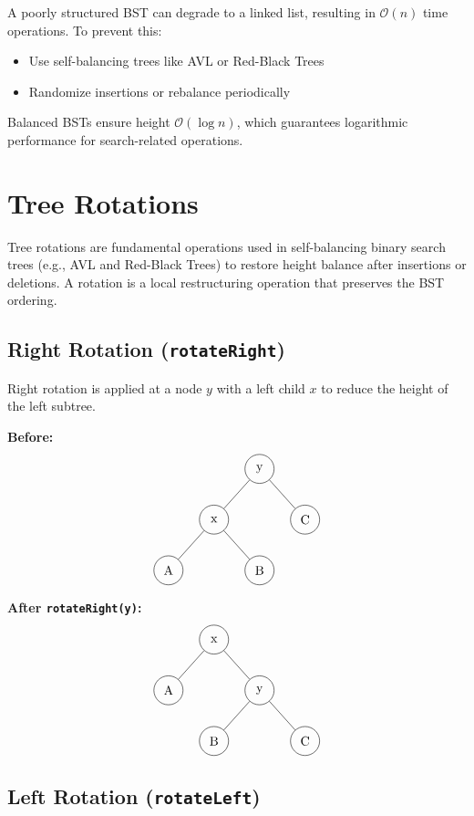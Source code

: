\documentclass{article}
\begin{document}
A poorly structured BST can degrade to a linked list, resulting in $\mathcal{O}(n)$ time operations. To prevent this:

\begin{itemize}
  \item Use self-balancing trees like AVL or Red-Black Trees
  \item Randomize insertions or rebalance periodically
\end{itemize}

Balanced BSTs ensure height $\mathcal{O}(\log n)$, which guarantees logarithmic performance for search-related operations.

\section{Tree Rotations}

Tree rotations are fundamental operations used in self-balancing binary search trees (e.g., AVL and Red-Black Trees) to restore height balance after insertions or deletions. A rotation is a local restructuring operation that preserves the BST ordering.

\subsection{Right Rotation (\texttt{rotateRight})}

Right rotation is applied at a node $y$ with a left child $x$ to reduce the height of the left subtree.

\textbf{Before:}
\[
\begin{tikzpicture}[
  every node/.style={circle, draw, minimum size=0.8cm},
  level distance=1.4cm,
  level 1/.style={sibling distance=2.5cm}
]
\node (y) {y}
  child {node (x) {x}
    child {node {A}}
    child {node {B}}
  }
  child {node {C}};
\end{tikzpicture}
\]

\textbf{After \texttt{rotateRight(y)}:}
\[
\begin{tikzpicture}[
  every node/.style={circle, draw, minimum size=0.8cm},
  level distance=1.4cm,
  level 1/.style={sibling distance=2.5cm}
]
\node (x) {x}
  child {node {A}}
  child {node (y) {y}
    child {node {B}}
    child {node {C}}
  };
\end{tikzpicture}
\]

\subsection{Left Rotation (\texttt{rotateLeft})}
\end{document}
